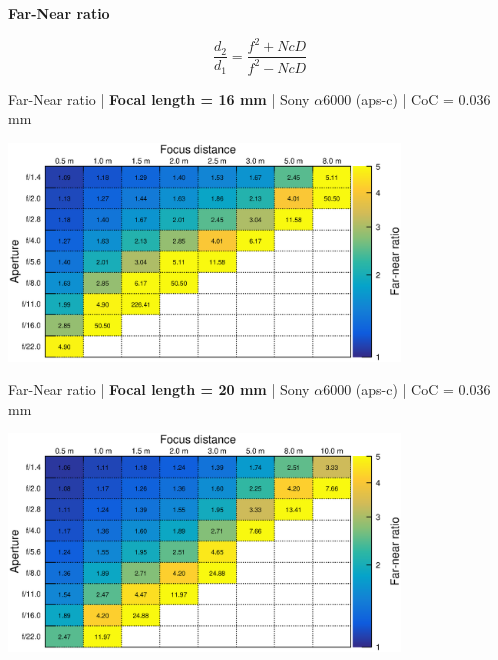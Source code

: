 \documentclass[aspectratio=169]{beamer}
\begin{document}

\begin{frame}[plain]{}
  \vspace{3ex}
  \begin{center} \LARGE \bf
    Far-Near ratio
  \end{center}

  {\Large 
    $$\mathit{\frac{d_2}{d_1} = \frac{f^2 + NcD}{f^2 - NcD}}$$
  }

\end{frame}

\begin{frame}[plain]{}
  \vspace{1ex}
  \centering
  Far-Near ratio | {\bf Focal length = 16 mm} |  Sony $\alpha$\hspace{0.1em}6000 (aps-c) | CoC = 0.036 mm
  
  \includegraphics[center,width=0.78\textwidth]{img/far-near-ratio_focl16.eps}
\end{frame}

\begin{frame}[plain]{}
  \vspace{1ex}
  \centering
  Far-Near ratio | {\bf Focal length = 20 mm} |  Sony $\alpha$\hspace{0.1em}6000 (aps-c) | CoC = 0.036 mm
  
  \includegraphics[center,width=0.78\textwidth]{img/far-near-ratio_focl20.eps}
\end{frame}
\end{document}
